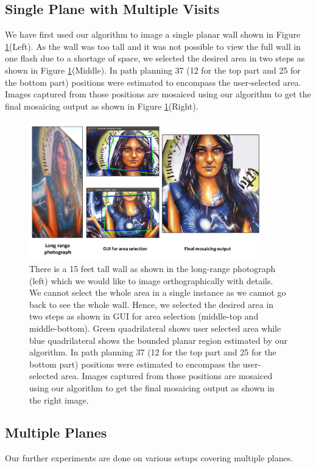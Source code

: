 \subsection{Single Plane with Multiple Visits}
We have first used our algorithm to image a single planar wall shown in
Figure \ref{fig:resultLady}(Left). As the wall was too tall and it was not
possible to view the full wall in one flash due to a shortage of space, we
selected the desired area in two steps as shown in Figure  \ref{fig:resultLady}(Middle). In path planning 37 (12
for the top part and 25 for the bottom part) positions were estimated to
encompass the user-selected area. Images captured from those positions are
mosaiced using our algorithm to get the final mosaicing output as shown in Figure \ref{fig:resultLady}(Right).
\begin{figure}
\centering
\includegraphics[width=0.9\textwidth]{figures/multiplanar/ladyResult.pdf}
\caption[Result: Single Plane]{There is a 15 feet tall wall as shown in the
long-range photograph (left) which we would like to image orthographically with details. We cannot
select the whole area in a single instance as we cannot go back to see the whole
wall. Hence, we selected the desired area in two steps as shown in GUI for area
selection (middle-top and middle-bottom). Green quadrilateral shows user selected area
while blue quadrilateral shows the bounded planar region estimated by our
algorithm. In path planning 37 (12 for the top part and 25 for the bottom part) positions were
estimated to encompass the user-selected area. Images captured from those
positions are mosaiced using our algorithm to get the final mosaicing output as shown in the
right image.}
\label{fig:resultLady}
\end{figure}

\subsection{Multiple Planes}
Our further experiments are done on various setups covering multiple planes.\\

